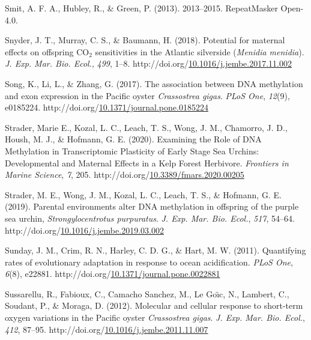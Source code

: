 \documentclass [11pt, proquest] {uwthesis}[2015/03/03]
\newlength{\cslhangindent}
\newenvironment{CSLReferences}%
{\setlength{\parindent}{0pt}%
\everypar{\setlength{\hangindent}{\cslhangindent}}\ignorespaces}%
{\par}
\begin{document}
\begin{CSLReferences}{1}{0}
\leavevmode\hypertarget{ref-Smit2013}{}%
Smit, A. F. A., Hubley, R., \& Green, P. (2013). {2013--2015. RepeatMasker Open-4.0}.

\leavevmode\hypertarget{ref-Snyder2018}{}%
Snyder, J. T., Murray, C. S., \& Baumann, H. (2018). {Potential for maternal effects on offspring {CO\(_2\)} sensitivities in the Atlantic silverside (\emph{Menidia menidia})}. \emph{J. Exp. Mar. Bio. Ecol.}, \emph{499}, 1--8. http://doi.org/\href{https://doi.org/10.1016/j.jembe.2017.11.002}{10.1016/j.jembe.2017.11.002}

\leavevmode\hypertarget{ref-Song2017}{}%
Song, K., Li, L., \& Zhang, G. (2017). {The association between DNA methylation and exon expression in the Pacific oyster \emph{Crassostrea gigas}}. \emph{PLoS One}, \emph{12}(9), e0185224. http://doi.org/\href{https://doi.org/10.1371/journal.pone.0185224}{10.1371/journal.pone.0185224}

\leavevmode\hypertarget{ref-Strader2020}{}%
Strader, Marie E., Kozal, L. C., Leach, T. S., Wong, J. M., Chamorro, J. D., Housh, M. J., \& Hofmann, G. E. (2020). {Examining the Role of DNA Methylation in Transcriptomic Plasticity of Early Stage Sea Urchins: Developmental and Maternal Effects in a Kelp Forest Herbivore}. \emph{Frontiers in Marine Science}, \emph{7}, 205. http://doi.org/\href{https://doi.org/10.3389/fmars.2020.00205}{10.3389/fmars.2020.00205}

\leavevmode\hypertarget{ref-Strader2019}{}%
Strader, M. E., Wong, J. M., Kozal, L. C., Leach, T. S., \& Hofmann, G. E. (2019). {Parental environments alter DNA methylation in offspring of the purple sea urchin, \emph{Strongylocentrotus purpuratus}}. \emph{J. Exp. Mar. Bio. Ecol.}, \emph{517}, 54--64. http://doi.org/\href{https://doi.org/10.1016/j.jembe.2019.03.002}{10.1016/j.jembe.2019.03.002}

\leavevmode\hypertarget{ref-Sunday2011}{}%
Sunday, J. M., Crim, R. N., Harley, C. D. G., \& Hart, M. W. (2011). {Quantifying rates of evolutionary adaptation in response to ocean acidification}. \emph{PLoS One}, \emph{6}(8), e22881. http://doi.org/\href{https://doi.org/10.1371/journal.pone.0022881}{10.1371/journal.pone.0022881}

\leavevmode\hypertarget{ref-Sussarellu2012}{}%
Sussarellu, R., Fabioux, C., Camacho Sanchez, M., Le Goı̈c, N., Lambert, C., Soudant, P., \& Moraga, D. (2012). {Molecular and cellular response to short-term oxygen variations in the Pacific oyster \emph{Crassostrea gigas}}. \emph{J. Exp. Mar. Bio. Ecol.}, \emph{412}, 87--95. http://doi.org/\href{https://doi.org/10.1016/j.jembe.2011.11.007}{10.1016/j.jembe.2011.11.007}


\end{CSLReferences}
\end{document}
